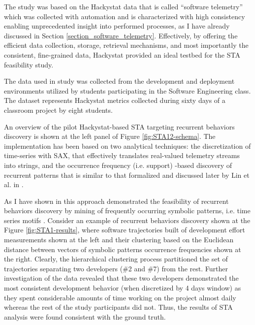 The study was based on the Hackystat data that is called ``software telemetry'' \cite{citeulike:12929227} which was collected with automation and is characterized with high consistency enabling unprecedented insight into performed processes, as I have already discussed in Section \ref{section_software_telemetry}. Effectively, by offering the efficient data collection, storage, retrieval mechanisms, and most importantly the consistent, fine-grained data, Hackystat provided an ideal testbed for the STA feasibility study.

The data used in study was collected from the development and deployment environments utilized by students participating in the Software Engineering class. The dataset represents Hackystat metrics collected during sixty days of a classroom project by eight students. 

An overview of the pilot Hackystat-based STA targeting recurrent behaviors discovery is shown at the left panel of Figure  \ref{fig:STA12-schema}. The implementation has been based on two analytical techniques: the discretization of time-series with SAX, that effectively translates real-valued telemetry streams into strings, and the occurrence frequency (i.e. support) -based discovery of recurrent patterns that is similar to that formalized and discussed later by Lin et al. in \cite{citeulike:10525778}. 

As I have shown in \cite{csdl2-10-09} this approach demonstrated the feasibility of recurrent behaviors discovery by mining of frequently occurring symbolic patterns, i.e. time series motifs \cite{sax}. Consider an example of recurrent behaviors discovery shown at the Figure \ref{fig:STA1-results}, where software trajectories built of development effort measurements shown at the left and their clustering based on the Euclidean distance between vectors of symbolic patterns occurrence frequencies shown at the right. Clearly, the hierarchical clustering process partitioned the set of trajectories separating two developers (\#2 and \#7) from the rest. Further investigation of the data revealed that these two developers demonstrated the most consistent development behavior (when discretized by 4 days window) as they spent considerable amounts of time working on the project almost daily whereas the rest of the study participants did not. Thus, the results of STA analysis were found consistent with the ground truth.

